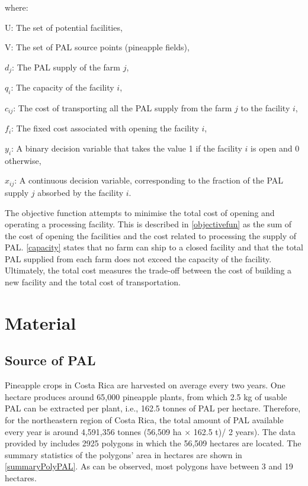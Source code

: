 where:
\begin{description}

    \item U: The set of potential facilities,
    
    \item V: The set of PAL source points (pineapple fields),
    
    \item $d_j$: The PAL supply of the farm $j$,
    
    \item $q_i$: The capacity of the facility $i$,
    
    \item $c_{ij}$: The cost of transporting all the PAL supply from the farm $j$ to the facility $i$, 
    
    \item $f_i$: The fixed cost associated with opening the facility $i$,
    
    \item $y_i$: A binary decision variable that takes the value 1 if the facility $i$ is open and 0 otherwise,
    
    \item $x_{ij}$: A continuous decision variable, corresponding to the fraction of the PAL supply $j$ absorbed by the facility $i$.
    
\end{description}

The objective function attempts to minimise the total cost of opening and operating a processing facility. This is described in \cref{objectivefun} as the sum of the cost of opening the facilities and the cost related to processing the supply of PAL. \cref{capacity} states that no farm can ship to a closed facility and that the total PAL supplied from each farm does not exceed the capacity of the facility. Ultimately, the total cost measures the trade-off between the cost of building a new facility and the total cost of transportation.  


\section{Material}

\subsection{Source of PAL}

Pineapple crops in Costa Rica are harvested on average every two years. One hectare produces around 65,000 pineapple plants, from which 2.5 kg of usable PAL can be extracted per plant, i.e., 162.5 tonnes of PAL per hectare. Therefore, for the northeastern region of Costa Rica, the total amount of PAL available every year is around 4,591,356 tonnes (56,509 ha $\times$ 162.5 t)/ 2 years). The data provided by \citeauthor{SNITpina} includes 2925 polygons in which the 56,509 hectares are located. The summary statistics of the polygons' area in hectares are shown in \cref{summaryPolyPAL}. As can be observed, most polygons have between 3 and 19 hectares. 


